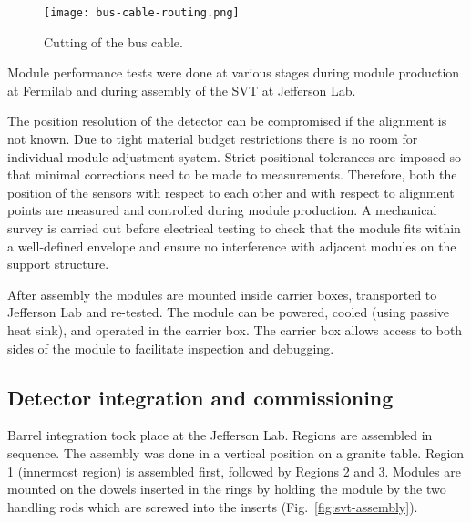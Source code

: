 \begin{figure}[hbt] 
\centering 
\texttt{[image: bus-cable-routing.png]}
\caption{Cutting of the bus cable.}
\label{fig:bus-cable-routing}
\end{figure}

Module performance tests were done at various stages during module production at Fermilab and during assembly of the SVT at Jefferson Lab. 

The position resolution of the detector can be compromised if the alignment is not known. Due to tight material budget restrictions there is no room for individual module adjustment system. Strict positional tolerances are imposed so that minimal corrections need to be made to measurements. Therefore, both the position of the sensors with respect to each other and with respect to alignment points are measured and controlled during module production. A mechanical survey is  carried out before electrical testing to check that the module fits within a well-defined envelope and ensure no interference with adjacent modules on the support structure.

After assembly the modules are mounted inside carrier boxes, transported to Jefferson Lab and re-tested. The module can be powered, cooled (using passive heat sink), and operated in the carrier box. The carrier box allows access to both sides of the module to facilitate inspection and debugging.

\subsection{Detector integration and commissioning}

Barrel integration took place at the Jefferson Lab. Regions are assembled in sequence. The assembly was done in a vertical position on a granite table. Region 1 (innermost region) is assembled first, followed by Regions 2 and 3. Modules are mounted on the dowels inserted in the rings by holding the module by the two handling rods which are screwed into the inserts (Fig.~\ref{fig:svt-assembly}). 

